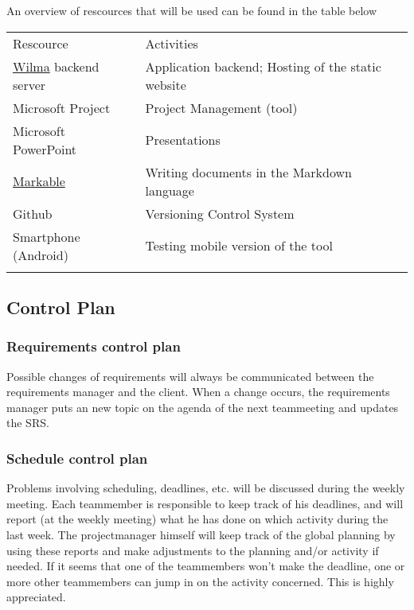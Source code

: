 \documentclass[9pt]{article}
\begin{document}
An overview of rescources that will be used can be found in the table
below

\begin{longtable}[c]{@{}ll@{}}
\hline\noalign{\medskip}
Rescource & Activities
\\\noalign{\medskip}
\hline\noalign{\medskip}
\hyperref[Wilma]{Wilma} backend server & Application backend; Hosting of
the static website
\\\noalign{\medskip}
Microsoft Project & Project Management (tool)
\\\noalign{\medskip}
Microsoft PowerPoint & Presentations
\\\noalign{\medskip}
\hyperref[markable]{Markable} & Writing documents in the Markdown
language
\\\noalign{\medskip}
Github & Versioning Control System
\\\noalign{\medskip}
Smartphone (Android) & Testing mobile version of the tool
\\\noalign{\medskip}
\hline
\end{longtable}

\subsection{Control Plan}\label{control-plan}

\subsubsection{Requirements control
plan}\label{requirements-control-plan}

Possible changes of requirements will always be communicated between the
requirements manager and the client. When a change occurs, the
requirements manager puts an new topic on the agenda of the next
teammeeting and updates the SRS.

\subsubsection{Schedule control plan}\label{schedule-control-plan}

Problems involving scheduling, deadlines, etc. will be discussed during
the weekly meeting. Each teammember is responsible to keep track of his
deadlines, and will report (at the weekly meeting) what he has done on
which activity during the last week. The projectmanager himself will
keep track of the global planning by using these reports and make
adjustments to the planning and/or activity if needed. If it seems that
one of the teammembers won't make the deadline, one or more other
teammembers can jump in on the activity concerned. This is highly
appreciated.
\end{document}
